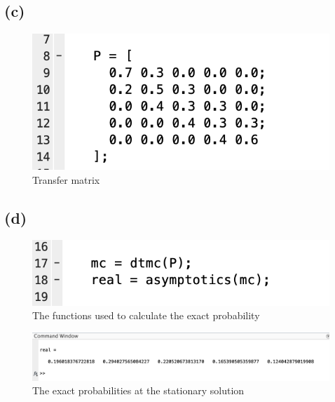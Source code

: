 \documentclass{article}
\begin{document}
\subsection{(c)}
\begin{figure}[H]
    \includegraphics[width=\linewidth]{./imgs/5c.png}
    \caption{Transfer matrix}
\end{figure}

\subsection{(d)}
\begin{figure}[H]
    \includegraphics[width=\linewidth]{./imgs/5dcode.png}
    \caption{The functions used to calculate the exact probability}
\end{figure}
\begin{figure}[H]
    \includegraphics[width=\linewidth]{./imgs/5dans.png}
    \caption{The exact probabilities at the stationary solution}
\end{figure}
\end{document}
